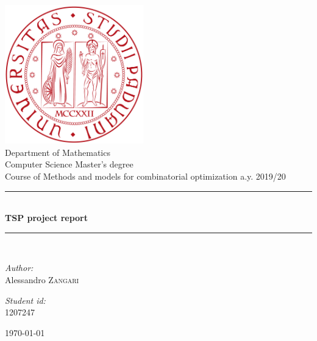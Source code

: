 \documentclass[a4paper,12pt]{article}
\theoremstyle{break}
\begin{document}

\begin{titlepage}
\thispagestyle{empty}
\begin{center}
	

\includegraphics[width=0.45\textwidth]{logo-unipd}\\[1cm]

{\large Department of Mathematics}\\[0.5cm]

{\large Computer Science Master's degree}\\[0.5cm]

{\large Course of Methods and models for combinatorial optimization a.y. 2019/20}\\[0.5cm]


\rule{\linewidth}{0.5mm} \\[0.4cm]
{ \huge \bfseries TSP project report \\[0.4cm] }
\rule{\linewidth}{0.5mm} \\[1.5cm]

\noindent
\begin{minipage}{0.4\textwidth}
  \begin{flushleft} \large
    \emph{Author:}\\
    Alessandro \textsc{Zangari}
  \end{flushleft}
\end{minipage}%
\begin{minipage}{0.4\textwidth}
  \begin{flushright} \large
    \emph{Student id:} \\
    \textsc{1207247}
  \end{flushright}
\end{minipage}

\vfill

{\today}

\end{center}
\end{titlepage}
\end{document}
